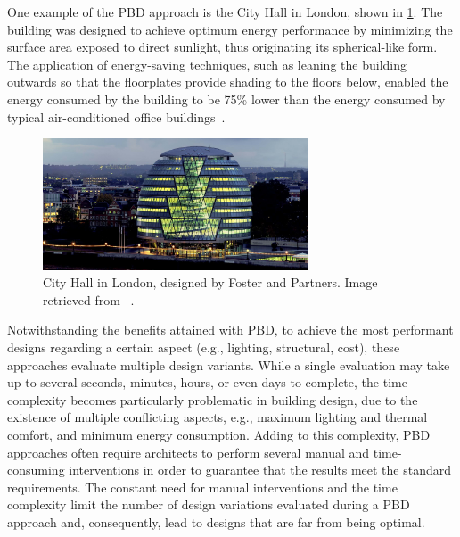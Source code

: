 	One example of the \ac{PBD} approach is the City Hall in London, shown in \cref{fig:cityhalllondon}. The building was designed to achieve optimum energy performance by minimizing the surface area exposed to direct sunlight, thus originating its spherical-like form. The application of energy-saving techniques, such as leaning the building outwards so that the floorplates provide shading to the floors below, enabled the energy consumed by the building to be 75\% lower than the energy consumed by typical air-conditioned office buildings~\cite{Malkawi2005-a}.
	\begin{figure}[htbp]
		\centering
		\includegraphics[width=0.70\textwidth]{./Images/Introduction/cityhalllondon.jpg}
		\caption[City Hall in London, designed by Foster and Partners]{City Hall in London, designed by Foster and Partners. Image retrieved from ~\cite{londoncityhall}.}
		\label{fig:cityhalllondon}
	\end{figure}

	Notwithstanding the benefits attained with \ac{PBD}, to achieve the most performant designs regarding a certain aspect (e.g., lighting, structural, cost), these approaches evaluate multiple design variants. While a single evaluation may take up to several seconds, minutes, hours, or even days to complete, the time complexity becomes particularly problematic in building design, due to the existence of multiple conflicting aspects, e.g., maximum lighting and thermal comfort, and minimum energy consumption. Adding to this complexity, \ac{PBD} approaches often require architects to perform several manual and time-consuming interventions in order to guarantee that the results meet the standard requirements. The constant need for manual interventions and the time complexity limit the number of design variations evaluated during a \ac{PBD} approach and, consequently, lead to designs that are far from being optimal.  
	
